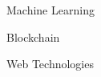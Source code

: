 




\begin{cvhonors}

  \cvhonor
    {Machine Learning} %
    {} %
    {} %
    {} %
    
    \cvhonor
    {Blockchain}
    {}
    {}
    {}
            
    \cvhonor
    {Web Technologies} {} {} {}
\end{cvhonors}
